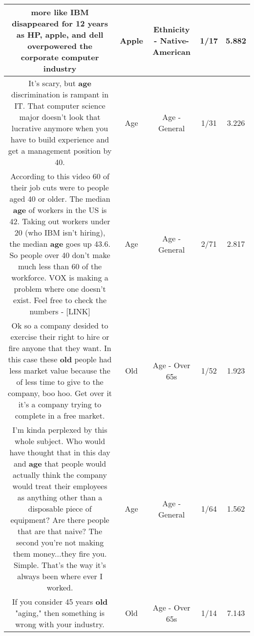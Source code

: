 \documentclass[11pt]{article}
\newlength\mylength
\begin{document}
\begin{center}
\begin{longtable}{|C{.65\mylength}|C{.30\mylength}|C{.12\mylength}|C{.12\mylength}|C{.12\mylength}|}
  \small more like IBM disappeared for 12 years as HP, \textbf{apple}, and dell overpowered the corporate computer industry\normalsize   & Apple & Ethnicity - Native-American & 1/17 & 5.882 \\  \hline
  \small It's scary, but \textbf{age} discrimination is rampant in IT. That computer science major doesn't look that lucrative anymore when you have to build experience and get a management position by 40.\normalsize   & Age & Age - General & 1/31 & 3.226 \\  \hline
  \small According to this video 60 of their job cuts were to people aged 40 or older. The median \textbf{age} of workers in the US is 42. Taking out workers under 20 (who IBM isn't hiring), the median \textbf{age} goes up 43.6. So people over 40 don't make much less than 60 of the workforce. VOX is making a problem where one doesn't exist. Feel free to check the numbers -  [LINK] \normalsize   & Age & Age - General & 2/71 & 2.817 \\  \hline
  \small Ok so a company desided to exercise their right to hire or fire anyone that they want. In this case these \textbf{old} people had less market value because the of less time to give to the company, boo hoo. Get over it it's a company trying to complete in a free market.\normalsize   & Old & Age - Over 65s & 1/52 & 1.923 \\  \hline
  \small I'm kinda perplexed by this whole subject.  Who would have thought that in this day and \textbf{age} that people would actually think the company would treat their employees as anything other than a disposable piece of equipment?  Are there people that are that naive?   The second you're not making them money...they fire you.  Simple.  That's the way it's always been where ever I worked.\normalsize   & Age & Age - General & 1/64 & 1.562 \\  \hline
  \small If you consider 45 years \textbf{old} "aging," then something is wrong with your industry.\normalsize   & Old & Age - Over 65s & 1/14 & 7.143 \\  \hline

\end{longtable}
\end{center}
\end{document}
